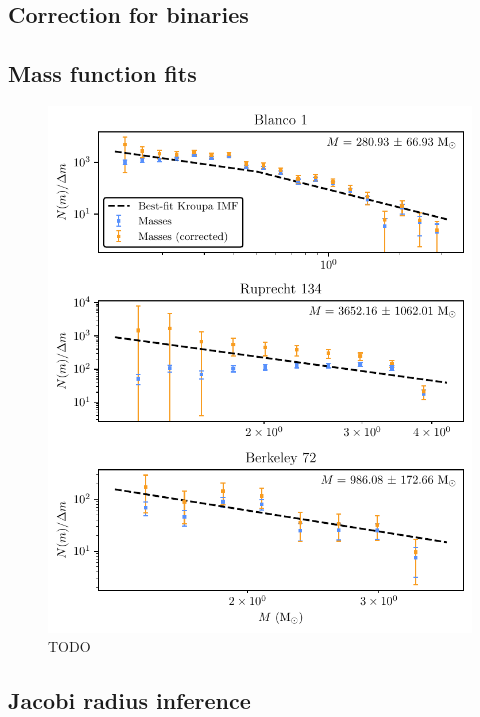 \subsection{Correction for binaries}
\label{sec:dynamics:masses:binaries}


\subsection{Mass function fits}
\label{sec:dynamics:masses:imf_fits}

\begin{figure}[p]
    \centering
    \includegraphics[width=\textwidth]{fig/c4/mass_functions.pdf}
    \caption[TODO]{TODO}
    \label{fig:dynamics:masses:mass_functions}
 \end{figure}


\subsection{Jacobi radius inference}
\label{sec:dynamics:masses:jacobi}

